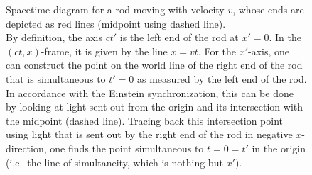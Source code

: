\documentclass[../relativity_main.tex]{subfiles}
\begin{document}
\begin{figure}
	\centering



		\caption[Spacetime diagram for a moving rod]{Spacetime diagram for a rod moving with velocity $v$, whose ends are depicted as red lines (midpoint using dashed line).\\
		By definition, the axis $ct'$ is the left end of the rod at $x' = 0$. In the $(ct, x)$-frame, it is given by the line $x = vt$. For the $x'$-axis, one can construct the point on the world line of the right end of the rod that is simultaneous to $t' = 0$ as measured by the left end of the rod. In accordance with the Einstein synchronization, this can be done by looking at light sent out from the origin and its intersection with the midpoint (dashed line). Tracing back this intersection point using light that is sent out by the right end of the rod in negative $x$-direction, one finds the point simultaneous to $t = 0 = t'$ in the origin (i.e.~the line of simultaneity, which is nothing but $x'$).}
		\label{fig:moving_rod_diagram}
\end{figure}
\end{document}
